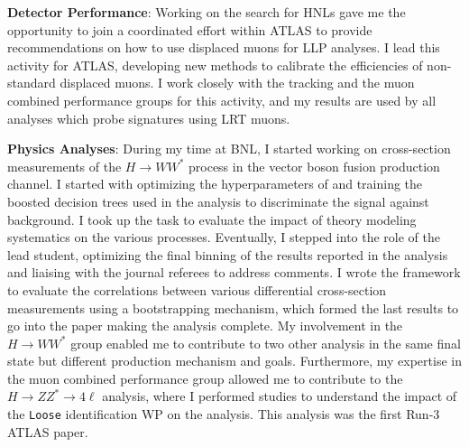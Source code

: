 \textbf{Detector Performance}: Working on the search for HNLs gave me the opportunity to join a coordinated effort within ATLAS to provide recommendations on how to use displaced muons for LLP analyses. I lead this activity for ATLAS, developing new methods to calibrate the efficiencies of non-standard displaced muons. I work closely with the tracking and the muon combined performance groups for this activity, and my results are used by all analyses which probe signatures using LRT muons.

\textbf{Physics Analyses}: During my time at BNL, I started working on cross-section measurements of the $H\to WW^*$ process in the vector boson fusion production channel. I started with optimizing the hyperparameters of and training the boosted decision trees used in the analysis to discriminate the signal against background. I took up the task to evaluate the impact of theory modeling systematics on the various processes. Eventually, I stepped into the role of the lead student, optimizing the final binning of the results reported in the analysis and liaising with the journal referees to address comments. I wrote the framework to evaluate the correlations between various differential cross-section measurements using a bootstrapping mechanism, which formed the last results to go into the paper making the analysis complete. My involvement in the $H\to WW^*$ group enabled me to contribute to two other analysis in the same final state but different production mechanism and goals. Furthermore, my expertise in the muon combined performance group allowed me to contribute to the $H\to ZZ^* \to 4\ell$ analysis, where I performed studies to understand the impact of the \texttt{Loose} identification WP on the analysis. This analysis was the first Run-3 ATLAS paper.
